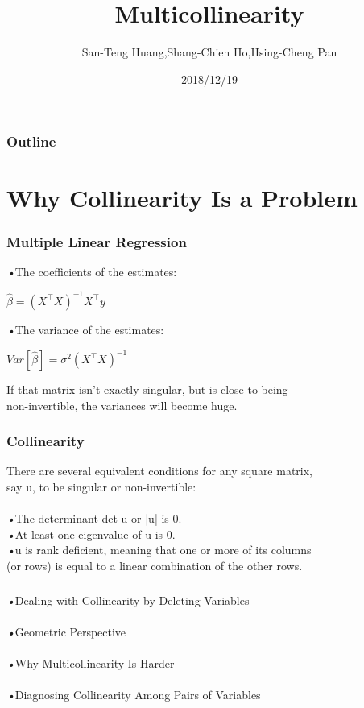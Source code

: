 \documentclass{beamer}
\title{Multicollinearity}
\author{San-Teng Huang,Shang-Chien Ho,Hsing-Cheng Pan}
\institute{National Dong Hwa University}
\date{2018/12/19}
\begin{document}
		
		\begin{frame}
		\titlepage
        \end{frame}
        
        \begin{frame}
		\frametitle{Outline} %
		\tableofcontents %
        \end{frame}
    
\section{Why Collinearity Is a Problem}

    \begin{frame}
      \frametitle{Multiple Linear Regression}
      \emph{•}The  coefficients of the estimates:
      \begin{center}
      	$\hat{\beta}={\left( X^\intercal X\right)}^{-1}X^\intercal y$
      \end{center}
      \emph{•}The  variance of the estimates:
  	  \begin{center}
  	  	$Var \left[ \hat{\beta}\right] ={\sigma}^2 {\left( X^\intercal X\right)}^{-1}$
  	  \end{center}
      \quad If that matrix isn't exactly singular, but is close to being
      \\\quad  non-invertible, the variances will become huge.
      \end{frame}
    
    \begin{frame}
      \frametitle{Collinearity}
      There are several equivalent conditions for any square matrix, 
      \\ say u, to be singular or non-invertible:
      \\\mbox{}
      \\\emph{•}The determinant det u or |u| is 0.
      \\\emph{•}At least one eigenvalue of u is 0. 
      \\\emph{•}u is rank deﬁcient, meaning that one or more of its columns
      \\\quad (or rows) is equal to a linear combination of the other rows.
    \end{frame}
         
 
 
    \begin{frame}
      \frametitle{}
      \emph{•}Dealing with Collinearity by Deleting Variables
      \\\mbox{}
      \\\emph{•}Geometric Perspective
      \\\mbox{}
      \\\emph{•}Why Multicollinearity Is Harder 
      \\\mbox{}
      \\\emph{•}Diagnosing Collinearity Among Pairs of Variables
           
    \end{frame}
    
\end{document}
